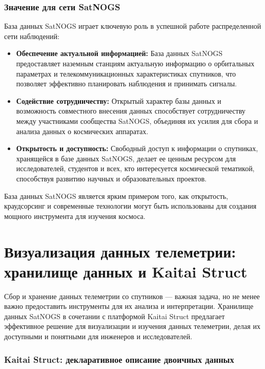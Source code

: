 \documentclass[14pt, a4paper]{../cls/coursework}
\begin{document}
    \subsubsection{Значение для сети SatNOGS}

    База данных SatNOGS играет ключевую роль в успешной работе распределенной сети наблюдений:

    \begin{itemize}
        \item \textbf{Обеспечение актуальной информацией:} База данных SatNOGS предоставляет наземным станциям актуальную информацию о орбитальных параметрах и телекоммуникационных характеристиках спутников, что позволяет эффективно планировать наблюдения и принимать сигналы.
        \item \textbf{Содействие сотрудничеству:} Открытый характер базы данных и возможность совместного внесения данных способствует сотрудничеству между участниками сообщества SatNOGS, объединяя их усилия для сбора и анализа данных о космических аппаратах.
        \item \textbf{Открытость и доступность:} Свободный доступ к информации о спутниках, хранящейся в базе данных SatNOGS, делает ее ценным ресурсом для исследователей, студентов и всех, кто интересуется космической тематикой, способствуя развитию научных и образовательных проектов.
    \end{itemize}

    База данных SatNOGS является ярким примером того, как открытость, краудсорсинг и современные технологии могут быть использованы для создания мощного инструмента для изучения космоса.

    \section{Визуализация данных телеметрии: хранилище данных и Kaitai Struct}

    Сбор и хранение данных телеметрии со спутников — важная задача, но не менее важно предоставить инструменты для их анализа и интерпретации.
    Хранилище данных SatNOGS в сочетании с платформой Kaitai Struct предлагает эффективное решение для визуализации и изучения данных телеметрии, делая их доступными и понятными для инженеров и исследователей.

    \subsubsection{Kaitai Struct: декларативное описание двоичных данных}
\end{document}
